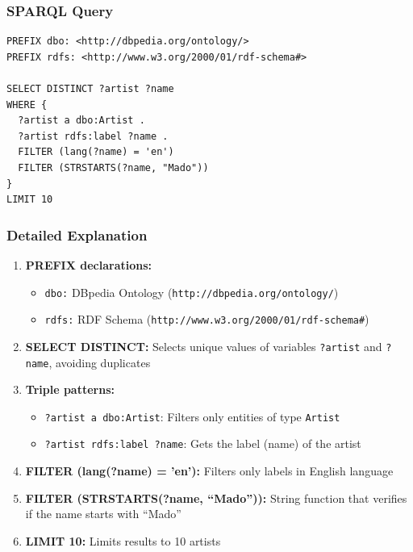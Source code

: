 \documentclass[12pt,a4paper]{article}
\begin{document}
\subsubsection{SPARQL Query}

\begin{lstlisting}[language=SPARQL, caption={Query 1: Artists starting with ``Mado''}]
PREFIX dbo: <http://dbpedia.org/ontology/>
PREFIX rdfs: <http://www.w3.org/2000/01/rdf-schema#>

SELECT DISTINCT ?artist ?name
WHERE {
  ?artist a dbo:Artist .
  ?artist rdfs:label ?name .
  FILTER (lang(?name) = 'en')
  FILTER (STRSTARTS(?name, "Mado"))
}
LIMIT 10
\end{lstlisting}

\subsubsection{Detailed Explanation}

\begin{enumerate}
    \item \textbf{PREFIX declarations:}
    \begin{itemize}
        \item \texttt{dbo:} DBpedia Ontology (\texttt{http://dbpedia.org/ontology/})
        \item \texttt{rdfs:} RDF Schema (\texttt{http://www.w3.org/2000/01/rdf-schema\#})
    \end{itemize}
    
    \item \textbf{SELECT DISTINCT:} Selects unique values of variables \texttt{?artist} and \texttt{?name}, avoiding duplicates
    
    \item \textbf{Triple patterns:}
    \begin{itemize}
        \item \texttt{?artist a dbo:Artist}: Filters only entities of type \texttt{Artist}
        \item \texttt{?artist rdfs:label ?name}: Gets the label (name) of the artist
    \end{itemize}
    
    \item \textbf{FILTER (lang(?name) = 'en'):} Filters only labels in English language
    
    \item \textbf{FILTER (STRSTARTS(?name, ``Mado'')):} String function that verifies if the name starts with ``Mado''
    
    \item \textbf{LIMIT 10:} Limits results to 10 artists
\end{enumerate}
\end{document}

